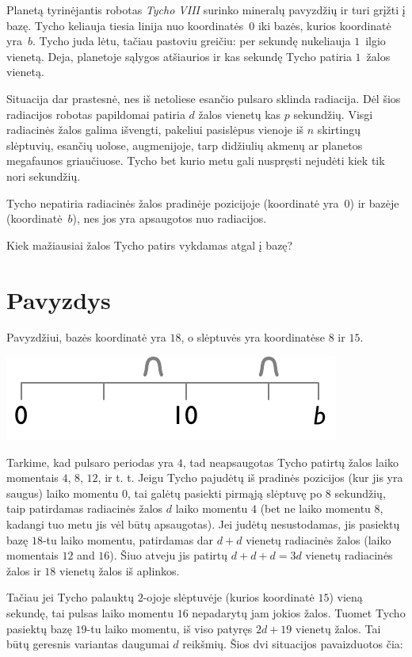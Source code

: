 

\noindent
Planetą tyrinėjantis robotas \emph{Tycho VIII} surinko mineralų pavyzdžių ir turi grįžti į bazę.
Tycho keliauja tiesia linija nuo koordinatės~$0$ iki bazės, kurios koordinatė yra~$b$.
Tycho juda lėtu, tačiau pastoviu greičiu: per sekundę nukeliauja $1$~ilgio vienetą.
Deja, planetoje sąlygos atšiaurios ir kas sekundę Tycho patiria $1$~žalos vienetą.

Situacija dar prastesnė, nes iš netoliese esančio pulsaro sklinda radiacija. 
Dėl šios radiacijos robotas papildomai patiria $d$ žalos vienetų kas $p$ sekundžių.
Visgi radiacinės žalos galima išvengti, pakeliui pasislėpus vienoje iš $n$ skirtingų slėptuvių, esančių uolose, augmenijoje, tarp didžiulių akmenų ar planetos megafaunos griaučiuose.
Tycho bet kurio metu gali nuspręsti nejudėti kiek tik nori sekundžių.

Tycho nepatiria radiacinės žalos pradinėje pozicijoje (koordinatė yra~$0$) ir bazėje (koordinatė~$b$), nes jos yra apsaugotos nuo radiacijos.


\medskip
Kiek mažiausiai žalos Tycho patirs vykdamas atgal į bazę?

\section*{Pavyzdys}

Pavyzdžiui, bazės koordinatė yra $18$, o slėptuvės yra koordinatėse $8$ ir $15$.

\includegraphics[width=.3\textwidth]{img/samplesetup}

Tarkime, kad pulsaro periodas yra $4$, tad neapsaugotas Tycho patirtų žalos laiko momentais $4$, $8$, $12$, ir t. t.
Jeigu Tycho pajudėtų iš pradinės pozicijos (kur jis yra saugus) laiko momentu $0$, tai galėtų pasiekti pirmąją slėptuvę po $8$ sekundžių, taip patirdamas radiacinės žalos $d$ laiko momentu $4$ (bet ne laiko momentu $8$, kadangi tuo metu jis vėl būtų apsaugotas).
Jei judėtų nesustodamas, jis pasiektų bazę $18$-tu laiko momentu, patirdamas dar $d+d$ vienetų radiacinės žalos (laiko momentais $12$ and $16$).
Šiuo atveju jis patirtų $d+d+d=3d$ vienetų radiacinės žalos ir
$18$ vienetų žalos iš aplinkos.

Tačiau jei Tycho palauktų $2$-ojoje slėptuvėje (kurios koordinatė $15$) vieną sekundę, tai pulsas laiko momentu $16$ nepadarytų jam jokios žalos. Tuomet Tycho pasiektų bazę $19$-tu laiko momentu, iš viso patyręs $2d + 19$ vienetų žalos.
Tai būtų geresnis variantas daugumai $d$ reikšmių.
Šios dvi situacijos pavaizduotos čia:

